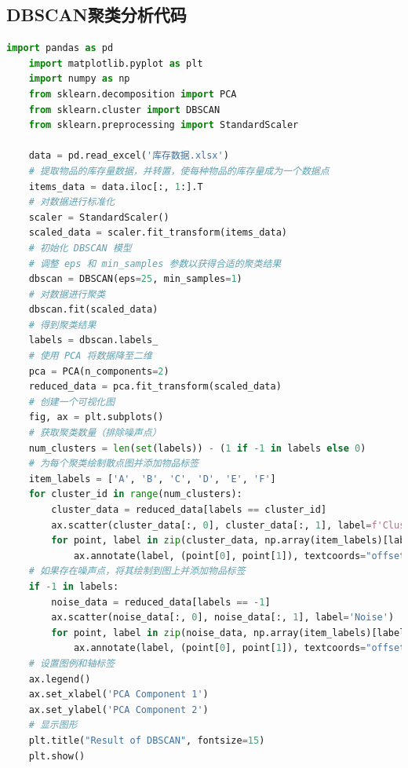 \documentclass[12pt,a4paper]{article}
\begin{document}
\subsection{DBSCAN聚类分析代码}
\begin{lstlisting}[language={python}]
    import pandas as pd
    import matplotlib.pyplot as plt
    import numpy as np
    from sklearn.decomposition import PCA
    from sklearn.cluster import DBSCAN
    from sklearn.preprocessing import StandardScaler

    data = pd.read_excel('库存数据.xlsx')
    # 提取物品的库存量数据，并转置，使每种物品的库存量成为一个数据点
    items_data = data.iloc[:, 1:].T
    # 对数据进行标准化
    scaler = StandardScaler()
    scaled_data = scaler.fit_transform(items_data)
    # 初始化 DBSCAN 模型
    # 调整 eps 和 min_samples 参数以获得合适的聚类结果
    dbscan = DBSCAN(eps=25, min_samples=1)
    # 对数据进行聚类
    dbscan.fit(scaled_data)
    # 得到聚类结果
    labels = dbscan.labels_
    # 使用 PCA 将数据降至二维
    pca = PCA(n_components=2)
    reduced_data = pca.fit_transform(scaled_data)
    # 创建一个可视化图
    fig, ax = plt.subplots()
    # 获取聚类数量（排除噪声点）
    num_clusters = len(set(labels)) - (1 if -1 in labels else 0)
    # 为每个聚类绘制散点图并添加物品标签
    item_labels = ['A', 'B', 'C', 'D', 'E', 'F']
    for cluster_id in range(num_clusters):
        cluster_data = reduced_data[labels == cluster_id]
        ax.scatter(cluster_data[:, 0], cluster_data[:, 1], label=f'Cluster {cluster_id}', s=120)
        for point, label in zip(cluster_data, np.array(item_labels)[labels == cluster_id]):
            ax.annotate(label, (point[0], point[1]), textcoords="offset points", xytext=(0, 5), ha='center')
    # 如果存在噪声点，将其绘制到图上并添加物品标签
    if -1 in labels:
        noise_data = reduced_data[labels == -1]
        ax.scatter(noise_data[:, 0], noise_data[:, 1], label='Noise')
        for point, label in zip(noise_data, np.array(item_labels)[labels == -1]):
            ax.annotate(label, (point[0], point[1]), textcoords="offset points", xytext=(0, 5), ha='center')
    # 设置图例和轴标签
    ax.legend()
    ax.set_xlabel('PCA Component 1')
    ax.set_ylabel('PCA Component 2')
    # 显示图形
    plt.title("Result of DBSCAN", fontsize=15)
    plt.show()
\end{lstlisting}
\end{document}
